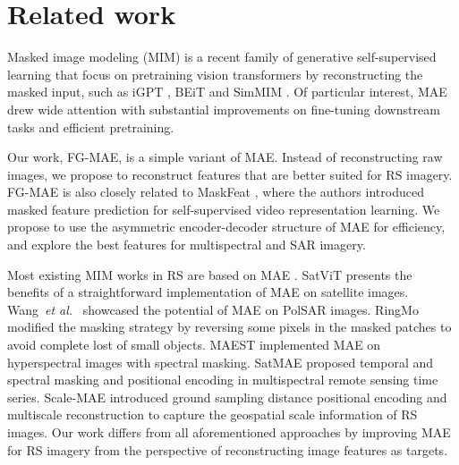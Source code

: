 \documentclass[lettersize,journal]{IEEEtran}
\newcommand{\etal}{\textit{et al.}}
\begin{document}
\vspace{-0.3em}
\section{Related work}
 \hspace{0.3em}
Masked image modeling (MIM) is a recent family of generative self-supervised learning that focus on pretraining vision transformers by reconstructing the masked input, such as iGPT \cite{chen2020generative}, BEiT \cite{bao2021beit} and SimMIM \cite{xie2022simmim}. Of particular interest, MAE \cite{he2022masked} drew wide attention with substantial improvements on fine-tuning downstream tasks and efficient pretraining. 

Our work, FG-MAE, is a simple variant of MAE. Instead of reconstructing raw images, we propose to reconstruct features that are better suited for RS imagery. FG-MAE is also closely related to MaskFeat \cite{wei2022masked}, where the authors introduced masked feature prediction for self-supervised video representation learning. We propose to use the asymmetric encoder-decoder structure of MAE for efficiency, and explore the best features for multispectral and SAR imagery.


\vspace{0.5em}
 \hspace{0.3em}
Most existing MIM works in RS are based on MAE \cite{fuller2022satvit,sun2022ringmo}. SatViT \cite{fuller2022satvit} presents the benefits of a straightforward implementation of MAE on satellite images. Wang~\etal~\cite{wang2022land} showcased the potential of MAE on PolSAR images. RingMo \cite{sun2022ringmo} modified the masking strategy by reversing some pixels in the masked patches to avoid complete lost of small objects. MAEST \cite{ibanez2022masked} implemented MAE on hyperspectral images with spectral masking. SatMAE \cite{cong2022satmae} proposed temporal and spectral masking and positional encoding in multispectral remote sensing time series. Scale-MAE \cite{reed2023scale} introduced ground sampling distance positional encoding and multiscale reconstruction to capture the geospatial scale information of RS images. Our work differs from all aforementioned approaches by improving MAE for RS imagery from the perspective of reconstructing image features as targets.
\end{document}
